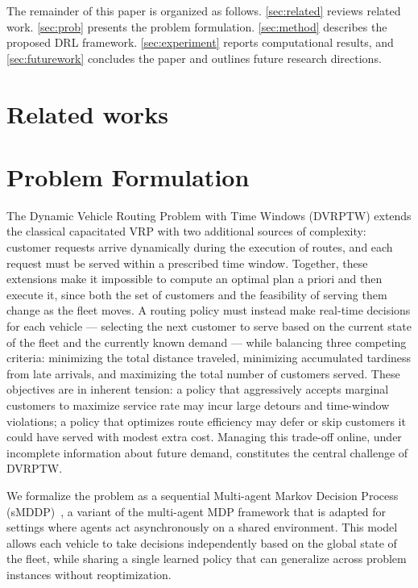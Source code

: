 \documentclass[conference]{IEEEtran}
\begin{document}
The remainder of this paper is organized as follows. \autoref{sec:related} reviews related work. \autoref{sec:prob} presents the problem formulation. \autoref{sec:method} describes the proposed DRL framework. \autoref{sec:experiment} reports computational results, and \autoref{sec:futurework} concludes the paper and outlines future research directions.
\section{Related works}\label{sec:related}

\section{Problem Formulation}
\label{sec:prob}

The Dynamic Vehicle Routing Problem with Time Windows (DVRPTW) extends the classical capacitated VRP with two additional sources of complexity: customer requests arrive dynamically during the execution of routes, and each request must be served within a prescribed time window.
Together, these extensions make it impossible to compute an optimal plan a priori and then execute it, since both the set of customers and the feasibility of serving them change as the fleet moves.
A routing policy must instead make real-time decisions for each vehicle --- selecting the next customer to serve based on the current state of the fleet and the currently known demand --- while balancing three competing criteria: minimizing the total distance traveled, minimizing accumulated tardiness from late arrivals, and maximizing the total number of customers served.
These objectives are in inherent tension: a policy that aggressively accepts marginal customers to maximize service rate may incur large detours and time-window violations; a policy that optimizes route efficiency may defer or skip customers it could have served with modest extra cost.
Managing this trade-off online, under incomplete information about future demand, constitutes the central challenge of DVRPTW.

We formalize the problem as a sequential Multi-agent Markov Decision Process (sMDDP)~\cite{TAM2026114234}, a variant of the multi-agent MDP framework that is adapted for settings where agents act asynchronously on a shared environment.
This model allows each vehicle to take decisions independently based on the global state of the fleet, while sharing a single learned policy that can generalize across problem instances without reoptimization.
\end{document}
